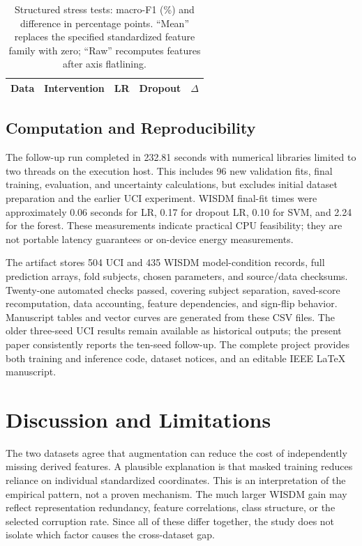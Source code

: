 \documentclass[conference]{IEEEtran}
\begin{document}
\begin{table}[t]
\caption{Structured stress tests: macro-F1 (\%) and difference in percentage points. ``Mean'' replaces the specified standardized feature family with zero; ``Raw'' recomputes features after axis flatlining.}
\label{tab:structured}\centering\footnotesize
\setlength{\tabcolsep}{3pt}
\begin{tabular}{llrrr}\toprule
Data & Intervention & LR & Dropout & $\Delta$ \\\midrule

\end{tabular}
\end{table}

\subsection{Computation and Reproducibility}
The follow-up run completed in 232.81 seconds with numerical libraries limited to two threads on the execution host. This includes 96 new validation fits, final training, evaluation, and uncertainty calculations, but excludes initial dataset preparation and the earlier UCI experiment. WISDM final-fit times were approximately 0.06 seconds for LR, 0.17 for dropout LR, 0.10 for SVM, and 2.24 for the forest. These measurements indicate practical CPU feasibility; they are not portable latency guarantees or on-device energy measurements.

The artifact stores 504 UCI and 435 WISDM model-condition records, full prediction arrays, fold subjects, chosen parameters, and source/data checksums. Twenty-one automated checks passed, covering subject separation, saved-score recomputation, data accounting, feature dependencies, and sign-flip behavior. Manuscript tables and vector curves are generated from these CSV files. The older three-seed UCI results remain available as historical outputs; the present paper consistently reports the ten-seed follow-up. The complete project provides both training and inference code, dataset notices, and an editable IEEE LaTeX manuscript.

\section{Discussion and Limitations}
The two datasets agree that augmentation can reduce the cost of independently missing derived features. A plausible explanation is that masked training reduces reliance on individual standardized coordinates. This is an interpretation of the empirical pattern, not a proven mechanism. The much larger WISDM gain may reflect representation redundancy, feature correlations, class structure, or the selected corruption rate. Since all of these differ together, the study does not isolate which factor causes the cross-dataset gap.
\end{document}
